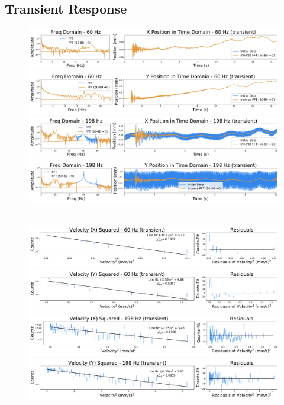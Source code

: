 \documentclass[12pt]{article}
\begin{document}
\subsection{Transient Response}
\begin{figure}[!ht]
\centering
    \includegraphics[width=\textwidth]{data_02_x_pos.pdf}
    \includegraphics[width=\textwidth]{data_02_y_pos.pdf}
    \includegraphics[width=\textwidth]{data_05_x_pos.pdf}
    \includegraphics[width=\textwidth]{data_05_y_pos.pdf}
	\caption{}
    \label{fig:trans_pos}
\end{figure}

\begin{figure}[!ht]
\centering\
    \includegraphics[width=\textwidth]{data_02_x_vel.pdf}
    \includegraphics[width=\textwidth]{data_02_y_vel.pdf}
    \includegraphics[width=\textwidth]{data_05_x_vel.pdf}
    \includegraphics[width=\textwidth]{data_05_y_vel.pdf}
	\caption{}
    \label{fig:trans_vel}
\end{figure}
\end{document}
